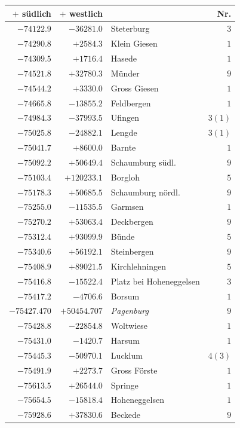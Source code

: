 \clearpage{}%
\begin{center}\begingroup\fontsize{8}{9}\selectfont
\setlength{\tabcolsep}{4pt}
\begin{tabular}{r|r|p{170pt}|r}\hline
\(+\) südlich&\(+\) westlich&&Nr.\\\hline
\(-74122.9\)&\(-36281.0\)&Steterburg&\(3\)\\
\(-74290.8\)&\(+2584.3\)&Klein Giesen&\(1\)\\
\(-74309.5\)&\(+1716.4\)&Hasede&\(1\)\\
\(-74521.8\)&\(+32780.3\)&Münder&\(9\)\\
\(-74544.2\)&\(+3330.0\)&Gross Giesen&\(1\)\\
\(-74665.8\)&\(-13855.2\)&Feldbergen&\(1\)\\
\(-74984.3\)&\(-37993.5\)&Ufingen&\(3 (1)\)\\
\(-75025.8\)&\(-24882.1\)&Lengde&\(3 (1)\)\\
\(-75041.7\)&\(+8600.0\)&Barnte&\(1\)\\
\(-75092.2\)&\(+50649.4\)&Schaumburg südl.&\(9\)\\
\(-75103.4\)&\(+120233.1\)&Borgloh&\(5\)\\
\(-75178.3\)&\(+50685.5\)&Schaumburg nördl.&\(9\)\\
\(-75255.0\)&\(-11535.5\)&Garmsen&\(1\)\\
\(-75270.2\)&\(+53063.4\)&Deckbergen&\(9\)\\
\(-75312.4\)&\(+93099.9\)&Bünde&\(5\)\\
\(-75340.6\)&\(+56192.1\)&Steinbergen&\(9\)\\
\(-75408.9\)&\(+89021.5\)&Kirchlehningen&\(5\)\\
\(-75416.8\)&\(-15522.4\)&Platz bei Hoheneggelsen&\(3\)\\
\(-75417.2\)&\(-4706.6\)&Borsum&\(1\)\\
\(-75427.470\)&\(+50454.707\)&\textit{Pagenburg}&\(9\)\\
\(-75428.8\)&\(-22854.8\)&Woltwiese&\(1\)\\
\(-75431.0\)&\(-1420.7\)&Harsum&\(1\)\\
\(-75445.3\)&\(-50970.1\)&Lucklum&\(4 (3)\)\\
\(-75491.9\)&\(+2273.7\)&Gross Förste&\(1\)\\
\(-75613.5\)&\(+26544.0\)&Springe&\(1\)\\
\(-75654.5\)&\(-15818.4\)&Hoheneggelsen&\(1\)\\
\(-75928.6\)&\(+37830.6\)&Beckede&\(9\)\\

\end{tabular}
\end{center}
